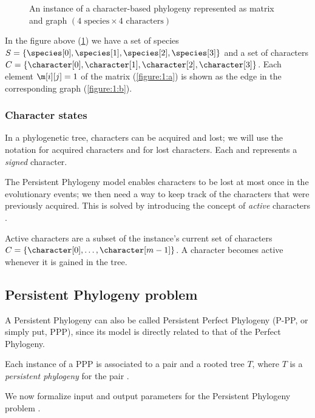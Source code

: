 \begin{figure}[h]
  

  \caption{An instance of a character-based phylogeny represented as matrix and graph $(\text{4 species} \times \text{4 characters})$}\label{figure:1}
\end{figure}

In the figure above (\ref{figure:1}) we have a set of species $S = \{ \species[0], \species[1], \species[2], \species[3] \}$ and a set of characters $C = \{ \character[0], \character[1], \character[2], \character[3] \}$.
Each element $\m[i][j] = 1$ of the matrix (\ref{figure:1:a}) is shown as the edge \edge{\species[i]}{\character[j]} in the corresponding graph (\ref{figure:1:b}).

\subsubsection{Character states}\label{section:character-states}

In a phylogenetic tree, characters can be acquired and lost; we will use the notation \character[][+] for acquired characters and \character[][-] for lost characters.
Each \character[][+] and \character[][-] represents a \emph{signed} character.

The Persistent Phylogeny model enables characters to be lost at most once in the evolutionary events; we then need a way to keep track of the characters that were previously acquired.
This is solved by introducing the concept of \emph{active} characters \cite{PPPbin2012, PPPcgraph2016, PPPptime2016}.

Active characters are a subset of the instance's current set of characters $C = \{ \character[0], \dots, \character[m-1] \}$.
A character becomes active whenever it is gained in the tree.

\subsection{Persistent Phylogeny problem}\label{section:ppp}

A Persistent Phylogeny can also be called Persistent Perfect Phylogeny (P-PP, or simply put, PPP), since its model is directly related to that of the Perfect Phylogeny.

Each instance of a PPP is associated to a pair \ma{} and a rooted tree $T$, where $T$ is a \emph{persistent phylogeny} for the pair \ma{}.

We now formalize input and output parameters for the Persistent Phylogeny problem \cite{PPPptime2016}.

